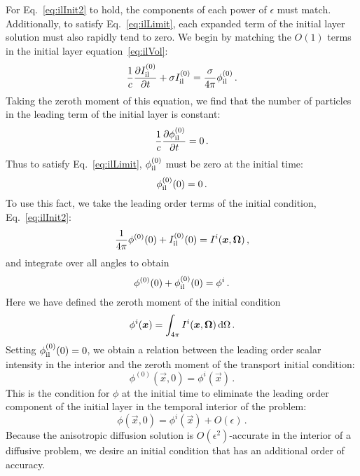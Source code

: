 For Eq.~\eqref{eq:ilInit2} to hold, the components of each power of
$\epsilon$ must match. Additionally, to satisfy Eq.~\eqref{eq:ilLimit}, each
expanded term of the initial layer solution must also rapidly
tend to zero. We begin by matching the $O(1)$ terms in the initial layer
equation~\eqref{eq:ilVol}:
\begin{equation}\label{eq:ilVolZeroth}
  \frac{1}{c}\frac{\partial I_\mathrm{il}^{(0)}}{\partial t}
  + \sigma I_\mathrm{il}^{(0)}
  = \frac{\sigma}{4\pi} \phi_\mathrm{il}^{(0)} \,.
\end{equation}
Taking the zeroth moment of this equation, we find that the number of particles
in the leading term of the initial layer is constant:
\begin{equation}\label{eq:ilVolZeroth2}
  \frac{1}{c}\frac{\partial \phi_\mathrm{il}^{(0)}}{\partial t} = 0 \,.
\end{equation}
Thus to satisfy Eq.~\eqref{eq:ilLimit}, $\phi_\mathrm{il}^{(0)}$ must be zero at the initial
time:
\begin{equation*}
  \phi_\mathrm{il}^{(0)}(0) = 0\,.
\end{equation*}
To use this fact, we take the leading order terms of the initial condition,
Eq.~\eqref{eq:ilInit2}:
\begin{equation*}
 \frac{1}{4\pi} \phi^{(0)}(0) + I_\mathrm{il}^{(0)}(0) = I^i(\bm{x},\bm{\Omega})\,,
\end{equation*}
and integrate over all angles to obtain
\begin{equation}\label{eq:ilInitZeroth}
 \phi^{(0)}(0) + \phi_\mathrm{il}^{(0)}(0) = \phi^i\,.
\end{equation}
Here we have defined the zeroth moment of the initial condition
\begin{equation*}
  \phi^i(\bm{x}) = \int_{4\pi} I^i(\bm{x},\bm{\Omega}) \mathop{}\!\mathrm{d}\Omega\,.
\end{equation*}
Setting $\phi_\mathrm{il}^{(0)}(0) = 0$, we obtain a relation between the leading order scalar
intensity in the interior and the zeroth moment of the transport initial
condition:
\begin{equation}\label{eq:ilZeroth}
  \phi^{(0)}(\vec{x}, 0) = \phi^i(\vec{x})\,.
\end{equation}
This is the condition for $\phi$ at the initial time to eliminate the leading
order component of the initial layer in the temporal interior of the problem:
\begin{equation*}
  \phi(\vec{x},0) = \phi^i(\vec{x}) + O(\epsilon)\,.
\end{equation*}
Because the anisotropic diffusion solution is $O(\epsilon^2)$-accurate in the
interior of a diffusive problem, we desire an initial condition that has an
additional order of accuracy.

